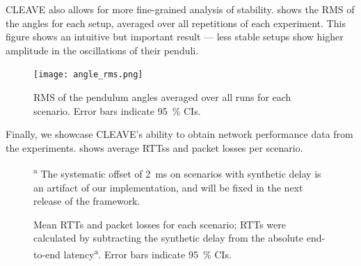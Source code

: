 \Ac{CLEAVE} also allows for more fine-grained analysis of stability.
 shows the \ac{RMS} of the angles for each setup, averaged over all repetitions of each experiment.
This figure shows an intuitive but important result --- less stable setups show higher amplitude in the oscillations of their penduli.

\begin{figure}
    \centering
    \texttt{[image: angle\_rms.png]}
    \caption{\Ac{RMS} of the pendulum angles averaged over all runs for each scenario.
    Error bars indicate \SI{95}{\percent} \acp{CI}.}%
    \label{fig:topple:rms}
\end{figure}

Finally, we showcase \ac{CLEAVE}'s ability to obtain network performance data from the experiments.
 shows average \acp{RTT}s and packet losses per scenario.

\begin{figure}
    \centering
    \caption[caption]{Mean \acp{RTT} and packet losses for each scenario; \acp{RTT} were calculated by subtracting the synthetic delay from the absolute end-to-end latency\textsuperscript{a}. Error bars indicate \SI{95}{\percent} \acp{CI}.}%
    \small\textsuperscript{a} The systematic offset of \SI{2}{\milli\second} on scenarios with synthetic delay is an artifact of our implementation, and will be fixed in the next release of the framework.
    \label{fig:network}
\end{figure}


